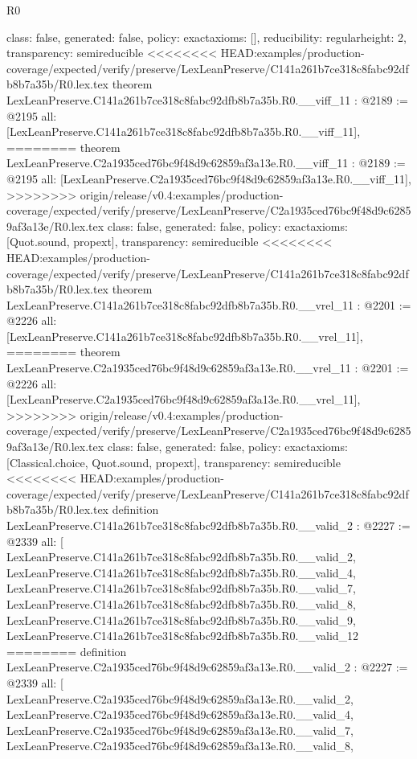 \begin{lexlean}{R0}
\begin{coremodule}
{{{{{{{{{{{{{{{{{{{{{{{{{{{{{{{{{{{{{{{{{{  class: false,
  generated: false,
  policy: exact{axioms: []},
  reducibility: regular{height: 2},
  transparency: semireducible
}
<<<<<<<< HEAD:examples/production-coverage/expected/verify/preserve/LexLeanPreserve/C141a261b7ce318c8fabc92dfb8b7a35b/R0.lex.tex
theorem LexLeanPreserve.C141a261b7ce318c8fabc92dfb8b7a35b.R0.__viff_11 : @2189 := @2195 {
  all: [LexLeanPreserve.C141a261b7ce318c8fabc92dfb8b7a35b.R0.__viff_11],
========
theorem LexLeanPreserve.C2a1935ced76bc9f48d9c62859af3a13e.R0.__viff_11 : @2189 := @2195 {
  all: [LexLeanPreserve.C2a1935ced76bc9f48d9c62859af3a13e.R0.__viff_11],
>>>>>>>> origin/release/v0.4:examples/production-coverage/expected/verify/preserve/LexLeanPreserve/C2a1935ced76bc9f48d9c62859af3a13e/R0.lex.tex
  class: false,
  generated: false,
  policy: exact{axioms: [Quot.sound, propext]},
  transparency: semireducible
}
<<<<<<<< HEAD:examples/production-coverage/expected/verify/preserve/LexLeanPreserve/C141a261b7ce318c8fabc92dfb8b7a35b/R0.lex.tex
theorem LexLeanPreserve.C141a261b7ce318c8fabc92dfb8b7a35b.R0.__vrel_11 : @2201 := @2226 {
  all: [LexLeanPreserve.C141a261b7ce318c8fabc92dfb8b7a35b.R0.__vrel_11],
========
theorem LexLeanPreserve.C2a1935ced76bc9f48d9c62859af3a13e.R0.__vrel_11 : @2201 := @2226 {
  all: [LexLeanPreserve.C2a1935ced76bc9f48d9c62859af3a13e.R0.__vrel_11],
>>>>>>>> origin/release/v0.4:examples/production-coverage/expected/verify/preserve/LexLeanPreserve/C2a1935ced76bc9f48d9c62859af3a13e/R0.lex.tex
  class: false,
  generated: false,
  policy: exact{axioms: [Classical.choice, Quot.sound, propext]},
  transparency: semireducible
}
<<<<<<<< HEAD:examples/production-coverage/expected/verify/preserve/LexLeanPreserve/C141a261b7ce318c8fabc92dfb8b7a35b/R0.lex.tex
definition LexLeanPreserve.C141a261b7ce318c8fabc92dfb8b7a35b.R0.__valid_2 : @2227 := @2339 {
  all: [
    LexLeanPreserve.C141a261b7ce318c8fabc92dfb8b7a35b.R0.__valid_2,
    LexLeanPreserve.C141a261b7ce318c8fabc92dfb8b7a35b.R0.__valid_4,
    LexLeanPreserve.C141a261b7ce318c8fabc92dfb8b7a35b.R0.__valid_7,
    LexLeanPreserve.C141a261b7ce318c8fabc92dfb8b7a35b.R0.__valid_8,
    LexLeanPreserve.C141a261b7ce318c8fabc92dfb8b7a35b.R0.__valid_9,
    LexLeanPreserve.C141a261b7ce318c8fabc92dfb8b7a35b.R0.__valid_12
========
definition LexLeanPreserve.C2a1935ced76bc9f48d9c62859af3a13e.R0.__valid_2 : @2227 := @2339 {
  all: [
    LexLeanPreserve.C2a1935ced76bc9f48d9c62859af3a13e.R0.__valid_2,
    LexLeanPreserve.C2a1935ced76bc9f48d9c62859af3a13e.R0.__valid_4,
    LexLeanPreserve.C2a1935ced76bc9f48d9c62859af3a13e.R0.__valid_7,
    LexLeanPreserve.C2a1935ced76bc9f48d9c62859af3a13e.R0.__valid_8,
}}}}}}}}}}}}}}}}}}}}}}}}}}}}}}}}}}}}}}}}}}}}}
\end{coremodule}
\end{lexlean}
